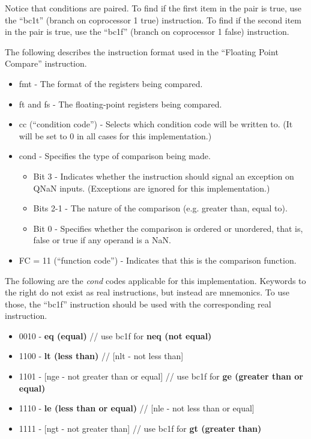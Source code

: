\documentclass[
    paper=letter,
    parskip=half,
    fontsize=12pt,
    titlepage=firstiscover,
    toc=bibliography,
    numbers=endperiod
]{scrartcl}
\providecommand{\tightlist}{%
  \setlength{\itemsep}{0pt}\setlength{\parskip}{0pt}}
\begin{document}
Notice that conditions are paired. To find if the first item in the pair
is true, use the ``bc1t'' (branch on coprocessor 1 true) instruction. To
find if the second item in the pair is true, use the ``bc1f'' (branch on
coprocessor 1 false) instruction.

The following describes the instruction format used in the ``Floating
Point Compare'' instruction.

\begin{itemize}
    \tightlist
    \item fmt - The format of the registers being compared.
    \item ft and fs - The floating-point registers being compared.
    \item cc (``condition code'') - Selects which condition code will be written to. (It will be set to 0 in all cases for this implementation.)
    \item cond - Specifies the type of comparison being made.
    \begin{itemize}
        \tightlist
        \item Bit 3 - Indicates whether the instruction should signal an exception on QNaN inputs. (Exceptions are ignored for this implementation.)
        \item Bits 2-1 - The nature of the comparison (e.g. greater than, equal to).
        \item Bit 0 - Specifies whether the comparison is ordered or unordered, that is, false or true if any operand is a NaN.
    \end{itemize}
    \item FC = 11 (``function code'') - Indicates that this is the comparison function.
\end{itemize}

The following are the \emph{cond} codes applicable for this
implementation. Keywords to the right do not exist as real instructions,
but instead are mnemonics. To use those, the ``bc1f'' instruction should
be used with the corresponding real instruction.

\begin{itemize}
    \tightlist
    \item 0010 - \textbf{eq (equal)} // use bc1f for \textbf{neq (not equal)}
    \item 1100 - \textbf{lt (less than)} // {[}nlt - not less than{]}
    \item 1101 - {[}nge - not greater than or equal{]} // use bc1f for \textbf{ge (greater than or equal)}
    \item 1110 - \textbf{le (less than or equal)} // {[}nle - not less than or equal{]}
    \item 1111 - {[}ngt - not greater than{]} // use bc1f for \textbf{gt (greater than)}
\end{itemize}
\end{document}
